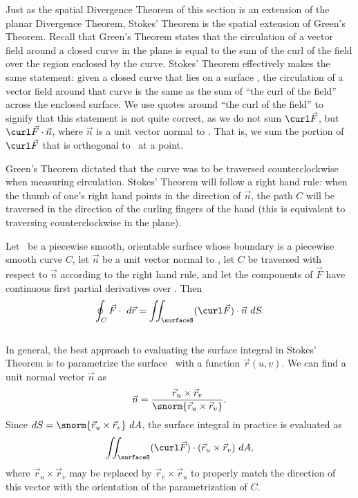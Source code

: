 Just as the spatial Divergence Theorem of this section is an extension of the planar Divergence Theorem, Stokes' Theorem is the spatial extension of Green's Theorem. Recall that Green's Theorem states that the circulation of a vector field around a closed curve in the plane is equal to the sum of the curl of the field over the region enclosed by the curve. Stokes' Theorem effectively makes the same statement: given a closed curve that lies on a surface \surfaceS, the circulation of a vector field around that curve is the same as the sum of ``the curl of the field'' across the enclosed surface. We use quotes around ``the curl of the field'' to signify that this statement is not quite correct, as we do not sum $\curl \vec F$, but $\curl \vec F\cdot\vec n$, where $\vec n$ is a unit vector normal to \surfaceS. That is, we sum the portion of $\curl \vec F$ that is orthogonal to \surfaceS\ at a point.

Green's Theorem dictated that the curve was to be traversed counterclockwise when measuring circulation. Stokes' Theorem will follow a right hand rule: when the thumb of one's right hand points in the direction of $\vec n$, the path $C$ will be traversed in the direction of the curling fingers of the hand (this is equivalent to traversing counterclockwise in the plane).

{Let \surfaceS\ be a piecewise smooth, orientable surface whose boundary is a piecewise smooth curve $C$, let $\vec n$ be a unit vector normal to \surfaceS, let $C$ be traversed with respect to $\vec n$ according to the right hand rule, and let the components of $\vec F$ have continuous first partial derivatives over \surfaceS. Then
\[
\oint_C \vec F\cdot \ d\vec r = \iint_\surfaceS (\curl\vec F)\cdot \vec n\ dS.
\]
}\\

In general, the best approach to evaluating the surface integral in Stokes' Theorem is to parametrize the surface \surfaceS\ with a function $\vec r(u,v)$. We can find a unit normal vector $\vec n$ as 
\[
\vec n = \frac{\vec r_u\times\vec r_v}{\snorm{\vec r_u\times\vec r_v}}.
\]
Since $dS = \snorm{\vec r_u\times\vec r_v}\ dA$, the surface integral in practice is evaluated as 
\[
\iint_\surfaceS (\curl \vec F)\cdot (\vec r_u\times\vec r_v)\ dA,
\]
where $\vec r_u\times\vec r_v$ may be replaced by $\vec r_v\times\vec r_u$ to properly match the direction of this vector with the orientation of the parametrization of $C$. \\

